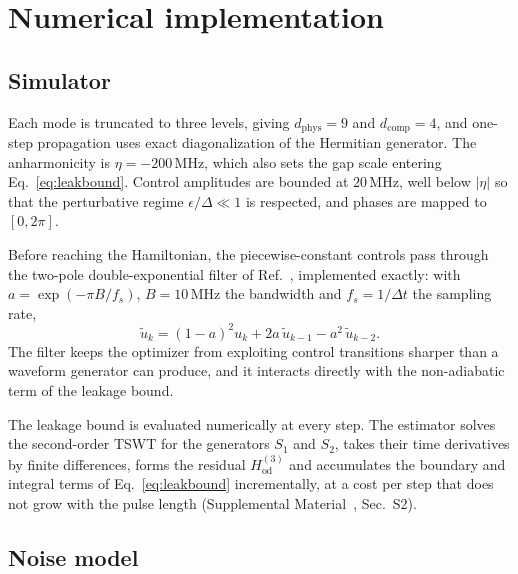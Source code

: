 \documentclass[aps,prx,twocolumn,superscriptaddress,nofootinbib,amsmath,amssymb,floatfix]{revtex4-2}
\newcommand{\MHz}{\,\mathrm{MHz}}
\begin{document}
\section{Numerical implementation}
\label{sec:methods}

\subsection{Simulator}

Each mode is truncated to three levels, giving $d_{\mathrm{phys}}=9$ and $d_{\mathrm{comp}}=4$, and
one-step propagation uses exact diagonalization of the Hermitian generator. The anharmonicity is
$\eta=-200\MHz$, which also sets the gap scale entering Eq.~\eqref{eq:leakbound}. Control amplitudes are
bounded at $20\MHz$, well below $|\eta|$ so that the perturbative regime $\epsilon/\Delta\ll1$ is
respected, and phases are mapped to $[0,2\pi]$.

Before reaching the Hamiltonian, the piecewise-constant controls pass through the two-pole
double-exponential filter of Ref.~\cite{Niu2019}, implemented exactly: with
$a=\exp(-\pi B/f_s)$, $B=10\MHz$ the bandwidth and $f_s=1/\Delta t$ the sampling rate,
\begin{equation}
\tilde u_k=(1-a)^2 u_k + 2a\,\tilde u_{k-1} - a^2\,\tilde u_{k-2}.
\label{eq:filter}
\end{equation}
The filter keeps the optimizer from exploiting control transitions sharper than a waveform generator can
produce, and it interacts directly with the non-adiabatic term of the leakage bound.

The leakage bound is evaluated numerically at every step. The estimator solves the second-order TSWT for
the generators $S_1$ and $S_2$, takes their time derivatives by finite differences, forms the residual
$H_{\mathrm{od}}^{(3)}$ and accumulates the boundary and integral terms of Eq.~\eqref{eq:leakbound}
incrementally, at a cost per step that does not grow with the pulse length (Supplemental Material~\cite{supp}, Sec.~S2).

\subsection{Noise model}
\label{sec:noise}
\end{document}
